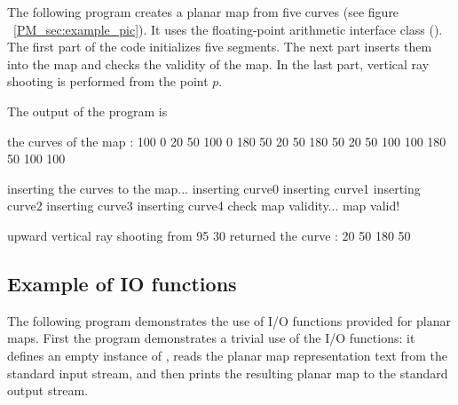 The following program creates a planar map from five curves (see
figure ~\ref{PM_sec:example_pic}). It uses the floating-point
arithmetic interface class
(). The first part of the
code initializes five segments. The next part inserts them into the map
and checks the validity of the map. In the last part, vertical ray
shooting is performed from the point $p$.


The output of the program is

\begin{ccExampleCode}
the curves of the map :
100 0 20 50
100 0 180 50
20 50 180 50
20 50 100 100
180 50 100 100

inserting the curves to the map...
inserting curve0
inserting curve1
inserting curve2
inserting curve3
inserting curve4
check map validity... map valid!

upward vertical ray shooting from 95 30
returned the curve : 20 50 180 50

\end{ccExampleCode}

\subsection{Example of IO functions}
\label{PM_sec:example9}

The following program demonstrates the use of I/O functions provided for planar maps. %
First the program demonstrates a trivial use of the I/O functions: 
it defines an empty instance of , 
reads the planar map representation text from the standard input stream, 
and then prints the resulting planar map to the standard output stream.

